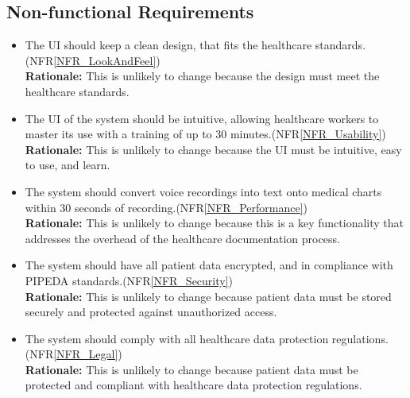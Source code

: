 \documentclass[12pt]{article}
\newcounter{lcnum} %
\newcounter{ulcnum} %
\begin{document}
\subsection{Non-functional Requirements}
\noindent \begin{itemize}
  \item[ULC\refstepcounter{ulcnum}\theulcnum\label{ULC_LookAndFeel}:] The UI should keep a clean design, that fits the healthcare standards.(NFR\ref{NFR_LookAndFeel})\\
  \textbf{Rationale:} This is unlikely to change because the design must meet the healthcare standards.

  \item[ULC\refstepcounter{ulcnum}\theulcnum\label{ULC_usability}:] The UI of the system should be intuitive, allowing healthcare workers to master its use with a training of up to 30 minutes.(NFR\ref{NFR_Usability})\\
  \textbf{Rationale:} This is unlikely to change because the UI must be intuitive, easy to use, and learn.

  \item[ULC\refstepcounter{ulcnum}\theulcnum\label{ULC_performance}:] The system should convert voice recordings into text onto medical charts within 30 seconds of recording.(NFR\ref{NFR_Performance})\\
  \textbf{Rationale:} This is unlikely to change because this is a key functionality that addresses the overhead of the healthcare documentation process.

  \item[ULC\refstepcounter{ulcnum}\theulcnum\label{ULC_security}:] The system should have all patient data encrypted, and in compliance with PIPEDA standards.(NFR\ref{NFR_Security})\\
  \textbf{Rationale:} This is unlikely to change because patient data must be stored securely and protected against unauthorized access.

  \item[ULC\refstepcounter{ulcnum}\theulcnum\label{ULC_legal}:] The system should comply with all healthcare data protection regulations. (NFR\ref{NFR_Legal})\\
  \textbf{Rationale:} This is unlikely to change because patient data must be protected and compliant with healthcare data protection regulations.
\end{itemize}

\newpage
\end{document}
